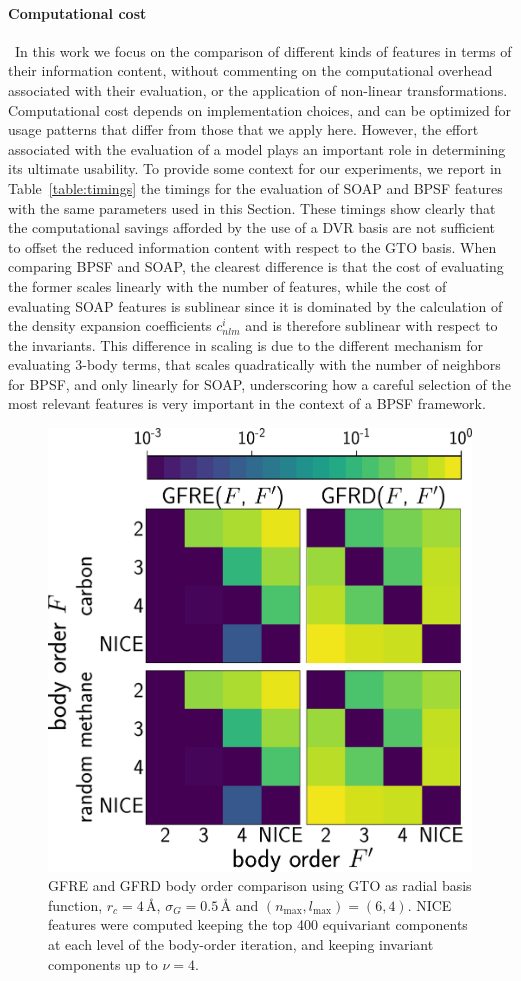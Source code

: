\paragraph*{Computational cost}\,
In this work we focus on the comparison of  different kinds of features in terms of their information content, without commenting on the computational overhead associated with their evaluation, or the application of non-linear transformations.
Computational cost depends on implementation choices, and can be optimized for usage patterns that differ from those that we apply here. 
However, the effort associated with the evaluation of a model plays an important role in determining its ultimate usability. To provide some context for our experiments, we report in Table~\ref{table:timings} the timings for the evaluation of SOAP and BPSF features with the same parameters used in this Section. 
These timings show clearly that the computational savings afforded by the use of a DVR basis are not sufficient to offset the reduced information content with respect to the GTO basis.
When comparing BPSF and SOAP, the clearest difference is that the cost of evaluating the former scales linearly with the number of features, while the cost of evaluating SOAP features is sublinear since it is dominated by the calculation of the density expansion coefficients $c^i_{nlm}$ and is therefore sublinear with respect to the invariants. 
This difference in scaling is due to the different mechanism for evaluating 3-body terms, that scales quadratically with the number of neighbors for BPSF, and only linearly for SOAP, underscoring how a careful selection of the most relevant features is very important in the context of a BPSF framework. 

\begin{figure}
    \centering
    \includegraphics[width=0.5\linewidth]{fig/rof/body_order_comparison-gfrm-gto-methane_carbon-inkscaped.pdf}
    \caption{GFRE and GFRD body order comparison using GTO as radial basis function, $r_c= 4\,$\AA{}, $\sigma_G=0.5\,$\AA{} and $(n_\text{max},l_\text{max})=(6,4)$. NICE features were computed keeping the top 400 equivariant components at each level of the body-order iteration, and keeping invariant components up to $\nu=4$.  }
    \label{fig:soap-bodyorder}
\end{figure}


